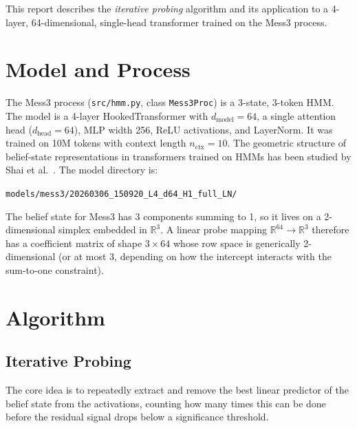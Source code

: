 \documentclass[11pt]{article}
\newcommand{\code}[1]{\texttt{#1}}
\begin{document}
This report describes the \emph{iterative probing} algorithm and its application to a 4-layer, 64-dimensional, single-head transformer trained on the Mess3 process.

\section{Model and Process}
\label{sec:model}

The Mess3 process (\code{src/hmm.py}, class \code{Mess3Proc}) is a 3-state, 3-token HMM.  The model is a 4-layer HookedTransformer with $d_{\text{model}} = 64$, a single attention head ($d_{\text{head}} = 64$), MLP width 256, ReLU activations, and LayerNorm.  It was trained on 10M tokens with context length $n_{\text{ctx}} = 10$.  The geometric structure of belief-state representations in transformers trained on HMMs has been studied by Shai et al.~\cite{shai2024transformers}.  The model directory is:
\begin{center}
\code{models/mess3/20260306\_150920\_L4\_d64\_H1\_full\_LN/}
\end{center}

The belief state for Mess3 has 3 components summing to 1, so it lives on a 2-dimensional simplex embedded in $\mathbb{R}^3$.  A linear probe mapping $\mathbb{R}^{64} \to \mathbb{R}^3$ therefore has a coefficient matrix of shape $3 \times 64$ whose row space is generically 2-dimensional (or at most 3, depending on how the intercept interacts with the sum-to-one constraint).

\section{Algorithm}
\label{sec:algorithm}

\subsection{Iterative Probing}
\label{sec:iterative-probing}

The core idea is to repeatedly extract and remove the best linear predictor of the belief state from the activations, counting how many times this can be done before the residual signal drops below a significance threshold.
\end{document}
